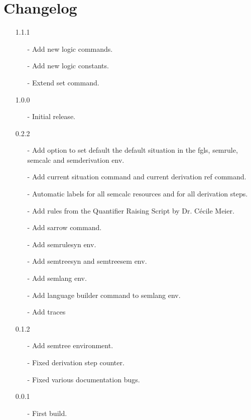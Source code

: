 \documentclass[10pt, a4paper]{article}
\begin{document}
	\section{Changelog}
	\begin{itemize}
		\item[1.1.1] 
		\begin{enumerate}
			\item[-] Add new logic commands.
			\item[-] Add new logic constants.
			\item[-] Extend set command.
		\end{enumerate}
		\item[1.0.0] 
		\begin{enumerate}
			\item[-] Initial release.
		\end{enumerate}
		\item[0.2.2] 
		\begin{enumerate}
			\item[-] Add option to set default the default situation in the fgls, semrule, semcalc and semderivation env.
			\item[-] Add current situation command and current derivation ref command.
			\item[-] Automatic labels for all semcalc resources and for all derivation steps.
			\item[-] Add rules from the Quantifier Raising Script by Dr. C\'{e}cile Meier.
			\item[-] Add sarrow command.
			\item[-] Add semrulesyn env.
			\item[-] Add semtreesyn and semtreesem env.
			\item[-] Add semlang env.
			\item[-] Add language builder command to semlang env.
			\item[-] Add traces
		\end{enumerate}
		\item[0.1.2] 
		\begin{enumerate}
			\item[-] Add semtree environment.
			\item[-] Fixed derivation step counter.
			\item[-] Fixed various documentation bugs.
		\end{enumerate}
		\item[0.0.1] 
		\begin{enumerate}
			\item[-] First build.
		\end{enumerate}
	\end{itemize}
\end{document}
